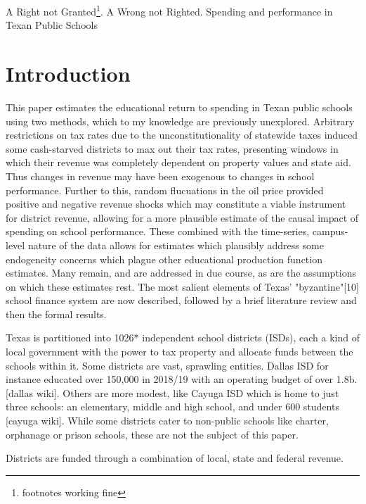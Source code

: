 \documentclass[11pt]{article}
\begin{document}
\setlength{\baselineskip}{0.3in}

A Right not Granted\footnote{footnotes working fine}. A Wrong not Righted.
Spending and performance in Texan Public Schools

\section{Introduction}
\label{s:intro}

This paper estimates the educational return to spending in Texan public schools using two methods, which to my knowledge are previously unexplored. Arbitrary restrictions on tax rates due to the unconstitutionality of statewide taxes induced some cash-starved districts to max out their tax rates, presenting windows in which their revenue was completely dependent on property values and state aid. Thus changes in revenue may have been exogenous to changes in school performance. Further to this, random flucuations in the oil price provided positive and negative revenue shocks which may constitute a viable instrument for district revenue, allowing for a more plausible estimate of the causal impact of spending on school performance. These combined with the time-series, campus-level nature of the data allows for estimates which plausibly address some endogeneity concerns which plague other educational production function estimates. Many remain, and are addressed in due course, as are the assumptions on which these estimates rest. The most salient elements of Texas' "byzantine"[10] school finance system are now described, followed by a brief literature review and then the formal results.

Texas is partitioned into 1026* independent school districts (ISDs), each a kind of local government with the power to tax property and allocate funds between the schools within it. Some districts are vast, sprawling entities. Dallas ISD for instance educated over 150,000 in 2018/19 with an operating budget of over 1.8b. [dallas wiki]. Others are more modest, like Cayuga ISD which is home to just three schools: an elementary, middle and high school, and under 600 students [cayuga wiki]. While some districts cater to non-public schools like charter, orphanage or prison schools, these are not the subject of this paper.

Districts are funded through a combination of local, state and federal revenue.
\end{document}
